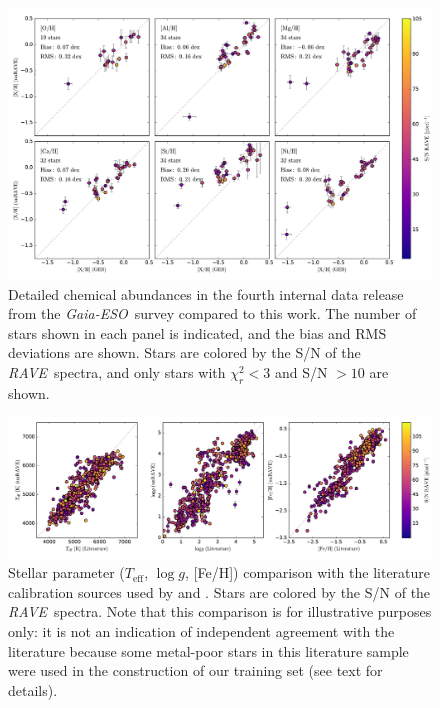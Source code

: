\documentclass[preprint,trackchanges]{aastex}
\newcommand{\acronym}[1]{{\small{#1}}}
\newcommand{\project}[1]{\textsl{#1}}
\newcommand{\rave}{\project{\acronym{RAVE}}}
\newcommand{\ges}{\project{Gaia-ESO}}
\newcommand{\teff}{T_{\mathrm{eff}}}
\newcommand{\logg}{\log g}
\begin{document}
\begin{figure}[p]
\includegraphics[width=\textwidth]{figures/ges-abundances.pdf}
\caption{Detailed chemical abundances in the fourth internal data release from the \ges\ survey compared to this work.  The number of stars shown in each panel is indicated, and the bias and RMS deviations are shown. Stars are colored by the S/N of the \rave\ spectra, and only stars with $\chi_r^2 < 3$ and S/N $> 10$ are shown.\label{fig:ges-abundances}}
\end{figure}


\begin{figure}[p]
\includegraphics[width=\textwidth]{figures/kordopatis-calibration.pdf}
\caption{Stellar parameter ($\teff$, $\logg$, [Fe/H]) comparison with the literature calibration sources used by \citet{Kordopatis_2013} and \citet{Kunder_2016}. Stars are colored by the S/N of the \rave\ spectra. Note that this comparison is for illustrative purposes only: it is not an indication of independent agreement with the literature because some metal-poor stars in this literature sample were used in the construction of our training set (see text for details).\label{fig:kordopatis-calibration}}
\end{figure}
\end{document}
